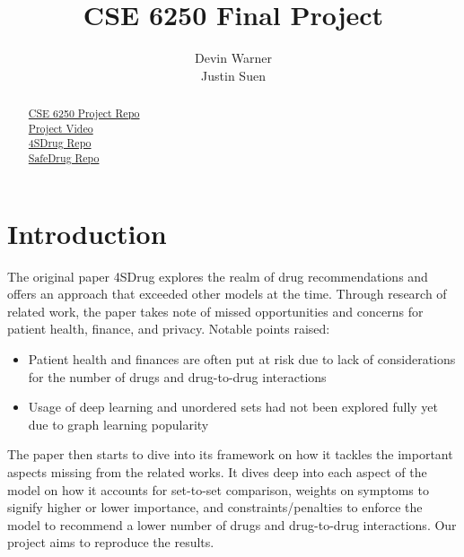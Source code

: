 \documentclass[letterpaper]{article} %
\title{CSE 6250 Final Project}
\author{
    Devin Warner\\
    Justin Suen
}
\begin{document}
\maketitle

\begin{abstract}
\href{https://github.com/devinwarner10/CSE6250-Project}{CSE 6250 Project Repo}\\
\href{https://youtu.be/j-bg-xcM3dw}{Project Video}\\
\href{https://github.com/Melinda315/4SDrug/tree/main}{4SDrug Repo}\\
\href{https://github.com/ycq091044/SafeDrug/tree/main}{SafeDrug Repo}
\end{abstract}

%

\section{Introduction}

The original paper 4SDrug explores the realm of drug recommendations and offers an approach that exceeded other models at the time.  Through research of related work, the paper takes note of missed opportunities and concerns for patient health, finance, and privacy.  Notable points raised:
\begin{itemize}
    \item Patient health and finances are often put at risk due to lack of considerations for the number of drugs and drug-to-drug interactions
    \item Usage of deep learning and unordered sets had not been explored fully yet due to graph learning popularity
\end{itemize}

The paper then starts to dive into its framework on how it tackles the important aspects missing from the related works.  It dives deep into each aspect of the model on how it accounts for set-to-set comparison, weights on symptoms to signify higher or lower importance, and constraints/penalties to enforce the model to recommend a lower number of drugs and drug-to-drug interactions. Our project aims to reproduce the results.
\end{document}
